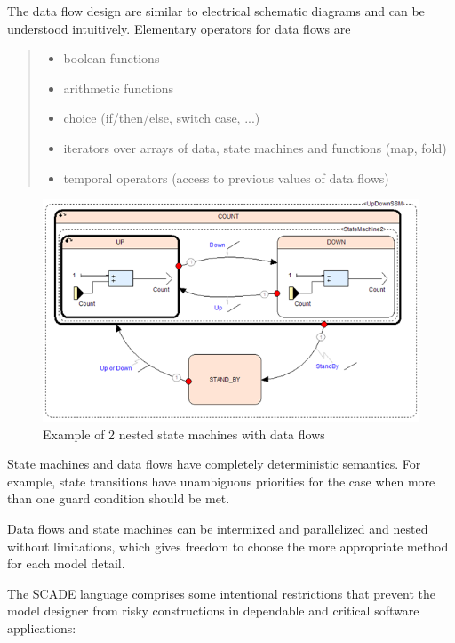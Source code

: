 \documentclass{template/openetcs_article}
\begin{document}
The data flow design are similar to electrical schematic diagrams and can be understood intuitively. 
Elementary operators for data flows are

\begin{quote}
	
\begin{itemize}
	\item boolean functions
	\item arithmetic functions
	\item choice (if/then/else, switch case, ...) 
  \item iterators over arrays of data, state machines and functions (map, fold)
  \item temporal operators (access to previous values of data flows)	
\end{itemize}
\end{quote}
 

\begin{figure}[htbp]
	\centering
		\includegraphics{StateMachine.png}
	\caption{Example of 2 nested state machines with data flows}
	\label{fig:StateMachine}
\end{figure}

State machines and data flows have completely deterministic semantics. For example, state transitions have unambiguous priorities for the case when more than one guard condition should be met. 

Data flows and state machines can be intermixed and parallelized and nested without limitations, which gives freedom to choose the more appropriate method for each model detail.

The SCADE language comprises some intentional restrictions that prevent the model designer from risky constructions in dependable and critical software applications: 
\end{document}
